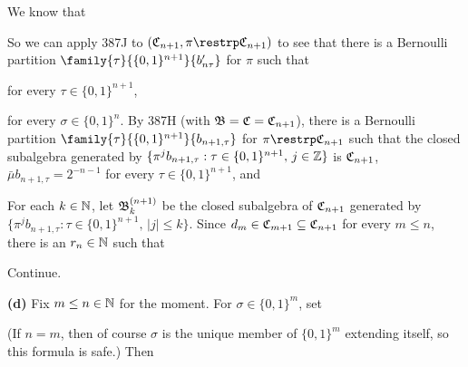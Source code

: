 {

\noindent We know that


\noindent So we can apply 387J to
$(\frak C_{n+1},\pi\restrp\frak C_{n+1})$
to see that there is a Bernoulli partition
$\family{\tau}{\{0,1\}^{n+1}}{b'_{n\tau}}$ for $\pi$ such that


\noindent for every $\tau\in\{0,1\}^{n+1}$,


\noindent for every $\sigma\in\{0,1\}^n$.   By 387H (with
$\frak B=\frak C=\frak C_{n+1}$), there is a Bernoulli partition
$\family{\tau}{\{0,1\}^{n+1}}{b_{n+1,\tau}}$ for
$\pi\restrp\frak C_{n+1}$ such that
the closed subalgebra generated by
$\{\pi^jb_{n+1,\tau}:\tau\in\{0,1\}^{n+1},\,j\in\Bbb Z\}$ is
$\frak C_{n+1}$, $\bar\mu b_{n+1,\tau}=2^{-n-1}$ for every
$\tau\in\{0,1\}^{n+1}$, and


\noindent For each $k\in\Bbb N$, let $\frak B^{(n+1)}_k$ be the closed
subalgebra of $\frak C_{n+1}$ generated by
$\{\pi^jb_{n+1,\tau}:\tau\in\{0,1\}^{n+1},\,|j|\le k\}$.   Since
$d_m\in\frak C_{m+1}\subseteq\frak C_{n+1}$ for every $m\le n$, there is
an $r_n\in\Bbb N$ such that


\noindent Continue.

\medskip

{\bf (d)} Fix $m\le n\in\Bbb N$ for the moment.   For
$\sigma\in\{0,1\}^m$, set


\noindent (If $n=m$, then of course $\sigma$ is the unique member of
$\{0,1\}^m$ extending itself, so this formula is safe.)   Then


}
